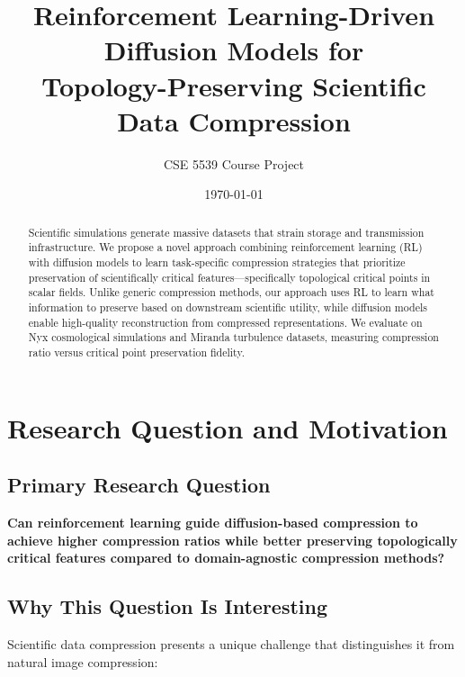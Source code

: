\documentclass[11pt]{article}
\title{Reinforcement Learning-Driven Diffusion Models for \\
Topology-Preserving Scientific Data Compression}
\author{CSE 5539 Course Project}
\date{\today}
\begin{document}
\maketitle

\begin{abstract}
Scientific simulations generate massive datasets that strain storage and transmission infrastructure. We propose a novel approach combining reinforcement learning (RL) with diffusion models to learn task-specific compression strategies that prioritize preservation of scientifically critical features—specifically topological critical points in scalar fields. Unlike generic compression methods, our approach uses RL to learn what information to preserve based on downstream scientific utility, while diffusion models enable high-quality reconstruction from compressed representations. We evaluate on Nyx cosmological simulations and Miranda turbulence datasets, measuring compression ratio versus critical point preservation fidelity.
\end{abstract}

\section{Research Question and Motivation}

\subsection{Primary Research Question}

\textbf{Can reinforcement learning guide diffusion-based compression to achieve higher compression ratios while better preserving topologically critical features compared to domain-agnostic compression methods?}

\subsection{Why This Question Is Interesting}

Scientific data compression presents a unique challenge that distinguishes it from natural image compression:
\end{document}
